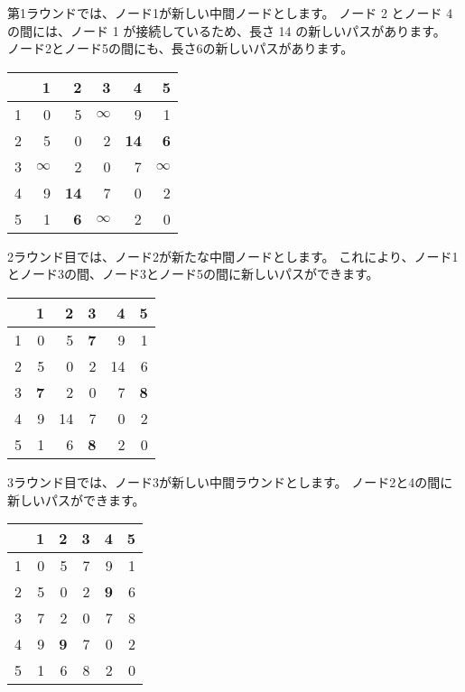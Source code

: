 第1ラウンドでは、ノード1が新しい中間ノードとします。
ノード 2 とノード 4 の間には、ノード 1 が接続しているため、長さ 14 の新しいパスがあります。
ノード2とノード5の間にも、長さ6の新しいパスがあります。

\begin{center}
\begin{tabular}{r|rrrrr}
 & 1 & 2 & 3 & 4 & 5 \\
\hline
1 & 0 & 5 & $\infty$ & 9 & 1 \\
2 & 5 & 0 & 2 & \textbf{14} & \textbf{6} \\
3 & $\infty$ & 2 & 0 & 7 & $\infty$ \\
4 & 9 & \textbf{14} & 7 & 0 & 2 \\
5 & 1 & \textbf{6} & $\infty$ & 2 & 0 \\
\end{tabular}
\end{center}
\vspace{10pt}


2ラウンド目では、ノード2が新たな中間ノードとします。
これにより、ノード1とノード3の間、ノード3とノード5の間に新しいパスができます。

\begin{center}
\begin{tabular}{r|rrrrr}
 & 1 & 2 & 3 & 4 & 5 \\
\hline
1 & 0 & 5 & \textbf{7} & 9 & 1 \\
2 & 5 & 0 & 2 & 14 & 6 \\
3 & \textbf{7} & 2 & 0 & 7 & \textbf{8} \\
4 & 9 & 14 & 7 & 0 & 2 \\
5 & 1 & 6 & \textbf{8} & 2 & 0 \\
\end{tabular}
\end{center}
\vspace{10pt}


3ラウンド目では、ノード3が新しい中間ラウンドとします。
ノード2と4の間に新しいパスができます。

\begin{center}
\begin{tabular}{r|rrrrr}
 & 1 & 2 & 3 & 4 & 5 \\
\hline
1 & 0 & 5 & 7 & 9 & 1 \\
2 & 5 & 0 & 2 & \textbf{9} & 6 \\
3 & 7 & 2 & 0 & 7 & 8 \\
4 & 9 & \textbf{9} & 7 & 0 & 2 \\
5 & 1 & 6 & 8 & 2 & 0 \\
\end{tabular}
\end{center}
\vspace{10pt}



